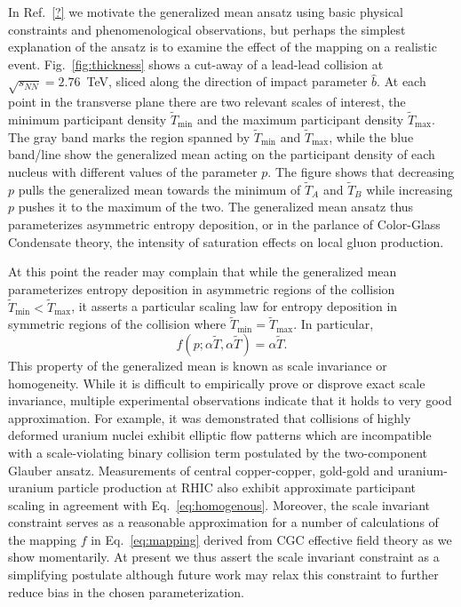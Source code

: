\documentclass[aps,prc,reprint,amsmath,nofootinbib,superscriptaddress]{revtex4-1}
\newcommand{\sqrts}{\sqrt{s_{NN}}}
\newcommand{\T}{\tilde{T}}
\begin{document}
In Ref.~\ref{?} we motivate the generalized mean ansatz using basic physical constraints and phenomenological observations, but perhaps the simplest explanation of the ansatz is to examine the effect of the mapping on a realistic event. Fig.~\ref{fig:thickness} shows a cut-away of a lead-lead collision at $\sqrts=2.76$~TeV, sliced along the direction of impact parameter $\hat{b}$. At each point in the transverse plane there are two relevant scales of interest, the minimum participant density $\T_\text{min}$ and the maximum participant density $\T_\text{max}$. The gray band marks the region spanned by $\T_\text{min}$ and $\T_\text{max}$, while the blue band/line show the generalized mean acting on the participant density of each nucleus with different values of the parameter $p$. The figure shows that decreasing $p$ pulls the generalized mean towards the minimum of $\T_A$ and $\T_B$ while increasing $p$ pushes it to the maximum of the two. The generalized mean ansatz thus parameterizes asymmetric entropy deposition, or in the parlance of Color-Glass Condensate theory, the intensity of saturation effects on local gluon production.

At this point the reader may complain that while the generalized mean parameterizes entropy deposition in asymmetric regions of the collision $\T_\text{min} < \T_\text{max}$, it asserts a particular scaling law for entropy deposition in symmetric regions of the collision where $\T_\text{min} = \T_\text{max}$. In particular,
\begin{equation}
  f(p; \alpha \T, \alpha \T) = \alpha \T.
  \label{eq:homogenous}
\end{equation}
This property of the generalized mean is known as scale invariance or homogeneity. While it is difficult to empirically prove or disprove exact scale invariance, multiple experimental observations indicate that it holds to very good approximation. For example, it was demonstrated that collisions of highly deformed uranium nuclei exhibit elliptic flow patterns which are incompatible with a scale-violating binary collision term postulated by the two-component Glauber ansatz. Measurements of central copper-copper, gold-gold and uranium-uranium particle production at RHIC also exhibit approximate participant scaling in agreement with Eq.~\eqref{eq:homogenous}. Moreover, the scale invariant constraint serves as a reasonable approximation for a number of calculations of the mapping $f$ in Eq.~\eqref{eq:mapping} derived from CGC effective field theory as we show momentarily. At present we thus assert the scale invariant constraint as a simplifying postulate although future work may relax this constraint to further reduce bias in the chosen parameterization.
\end{document}
